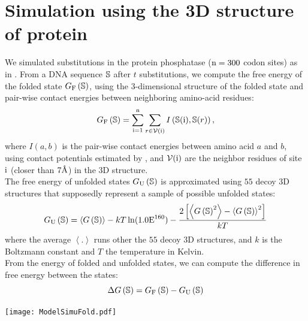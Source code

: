 \section{Simulation using the 3D structure of protein}
\label{sec:simulation-using-the-3d-structure-of-protein}

We simulated substitutions in the protein phosphatase ($\text{n}=300$ codon sites) as in \citet{Goldstein2017}.
From a \acrshort{DNA} sequence $\mathbb{S}$ after $t$ substitutions, we compute the free energy of the folded state $ G_{\text{F}} \left(\mathbb{S}\right)$, using the 3-dimensional structure of the folded state and pair-wise contact energies between neighboring amino-acid residues:
\begin{equation}
    G_{\text{F}} \left(\mathbb{S}\right) = \sum\limits_{\text{i}=1}^{\text{n}} \sum\limits_{r \in \mathcal{V}(\text{i})} I \left(\mathbb{S}(\text{i}), \mathbb{S}(r) \right),
\end{equation}
where $I(a,b)$ is the pair-wise contact energies between amino acid $a$ and $b$, using contact potentials estimated by \citet{Miyazawa1985}, and $\mathcal{V}(\text{i})$ are the neighbor residues of site $\text{i}$ (closer than $7\text{\normalfont\AA}$) in the 3D structure.\\

The free energy of unfolded states $G_{\text{U}} \left(\mathbb{S}\right)$ is approximated using $55$ decoy 3D structures that supposedly represent a sample of possible unfolded states:
\begin{equation}
    G_{\text{U}} \left(\mathbb{S}\right) = \left\langle G\left(\mathbb{S}\right) \right\rangle - kT \ln (1.0\text{E}^{160}) - \dfrac{2 \left[ \left\langle G\left(\mathbb{S}\right)^2 \right\rangle - \left\langle G\left(\mathbb{S}\right) \right\rangle^2\right] }{kT}
\end{equation}
where the average $\left\langle . \right\rangle$ runs other the $55$ decoy 3D structures, and $k$ is the Boltzmann constant and $T$ the temperature in Kelvin.\\

From the energy of folded and unfolded states, we can compute the difference in free energy between the states:
\begin{equation}
    \Delta G\left(\mathbb{S}\right) = G_{\text{F}} \left(\mathbb{S}\right) - G_{\text{U}} \left(\mathbb{S}\right)
\end{equation}

\begin{center}
    \texttt{[image: ModelSimuFold.pdf]}
\end{center}

